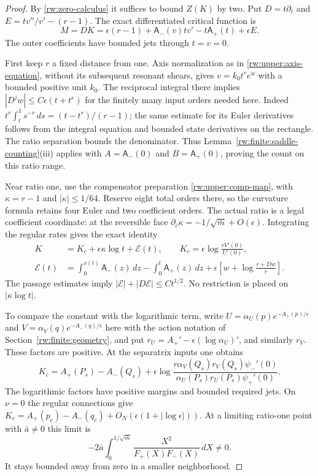 \begin{proof}
By \ref{rw:zero-calculus} it suffices to bound $Z(K)$ by two.
Put $D=t\partial_t$ and
$E=t v''/v'-(r-1)$. The exact differentiated critical function is
\begin{equation}\label{rw:finite:saddle-M}
 M=DK=\epsilon(r-1)+\mathsf A_-(v)tv'-t\mathsf A_+(t)+\epsilon E.
\end{equation}
The outer coefficients have bounded jets through $t=v=0$.

First keep $r$ a fixed distance from one. Axis normalization as in
\eqref{rw:upper:axis-equation}, without its subsequent resonant
shears, gives $v=k_0t^r e^w$ with a bounded positive unit $k_0$.
The reciprocal integral there implies
$|D^jw|\le C\epsilon(t+t^r)$ for the finitely many input orders
needed here. Indeed
$t^r\int_t^1s^{-r}\,ds=(t-t^r)/(r-1)$; the same estimate for
its Euler derivatives follows from the integral equation and bounded
state derivatives on the rectangle. The ratio separation bounds the
denominator. Thus Lemma~\ref{rw:finite:saddle-counting}\textup{(iii)}
applies with $A=\mathsf A_-(0)$ and
$B=\mathsf A_+(0)$, proving the count on this ratio range.

Near ratio one, use the compensator preparation
\eqref{rw:upper:comp-map}, with $\kappa=r-1$ and $|\kappa|\le1/64$.
Reserve eight total orders there, so the curvature formula retains
four Euler and two coefficient orders. The actual ratio is a legal
coefficient coordinate: at the reversible face
$\partial_{\bar c}\kappa=-1/\sqrt{\bar m}+O(\epsilon)$.
Integrating the regular rates gives the exact identity
\begin{equation}\label{rw:finite:saddle-log}
\begin{aligned}
 K&=K_c+\epsilon\kappa\log t+\mathcal E(t),\qquad
 K_c=\epsilon\log\frac{rV'(0)}{U'(0)},\\
 \mathcal E(t)&=\int_0^{v(t)}\mathsf A_-(z)\,dz-\int_0^t\mathsf A_+(z)\,dz
       +\epsilon\left[w+\log\frac{r+Dw}{r}\right].
\end{aligned}
\end{equation}
The passage estimates imply
$|\mathcal E|+|D\mathcal E|\le Ct^{1/2}$.
No restriction is placed on $|\kappa\log t|$.

To compare the constant with the logarithmic term, write
$U=\alpha_U(p)e^{-A_+(p)/\epsilon}$ and
$V=\alpha_V(q)e^{-A_-(q)/\epsilon}$ here with the action notation
of Section~\ref{rw:finite:geometry}, and put
$r_U=A_+'-\epsilon(\log\alpha_U)'$, and similarly $r_V$.
These factors are positive. At the separatrix inputs one obtains
\begin{equation}\label{rw:finite:saddle-constant}
 K_c=A_+(P_s)-A_-(Q_s)
  +\epsilon\log\frac{r\alpha_V(Q_s)r_V(Q_s)\psi_-'(0)}
                          {\alpha_U(P_s)r_U(P_s)\psi_+'(0)}.
\end{equation}
The logarithmic factors have positive margins and bounded required jets.
On $\nu=0$ the regular connections give
$K_c=A_+(p_c)-A_-(q_c)+O_N(\epsilon(1+|\log\epsilon|))$.
At a limiting ratio-one point with $\bar a\ne0$ this limit is
\[
 -2\bar a\int_0^{1/\sqrt{\bar m}}
                       \frac{X^2}{F_+(X)F_-(X)}\,dX\ne0.
\]
It stays bounded away from zero in a smaller neighborhood.


\end{proof}
